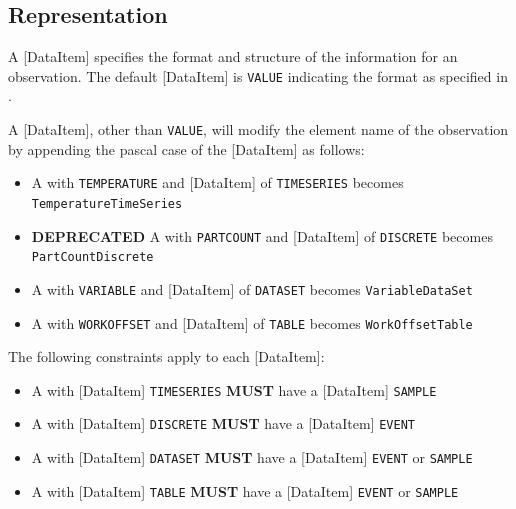 \subsection{Representation} \label{sec:Representation}


A [DataItem] specifies the format and structure of the information for an \gls{observation}. The default [DataItem] is \texttt{VALUE} indicating the format as specified in .

A [DataItem], other than \texttt{VALUE}, will modify the element name of the \gls{observation} by appending the pascal case of the [DataItem] as follows:

\begin{itemize}
\item  A  with  \texttt{TEMPERATURE} and [DataItem] of \texttt{TIME\textunderscore SERIES} becomes \texttt{TemperatureTimeSeries}


\item  \textbf{DEPRECATED} A  with  \texttt{PART\textunderscore COUNT} and [DataItem] of \texttt{DISCRETE} becomes \texttt{PartCountDiscrete}


\item  A  with  \texttt{VARIABLE} and [DataItem] of \texttt{DATA\textunderscore SET} becomes \texttt{VariableDataSet}


\item  A  with  \texttt{WORK\textunderscore OFFSET} and [DataItem] of \texttt{TABLE} becomes \texttt{WorkOffsetTable}


\end{itemize}



The following constraints apply to each [DataItem]:

\begin{itemize}
\item  A  with [DataItem] \texttt{TIME\textunderscore SERIES} \textbf{MUST} have a [DataItem] \texttt{SAMPLE}


\item  \DEPRECATED A  with [DataItem] \texttt{DISCRETE} \textbf{MUST} have a [DataItem] \texttt{EVENT}


\item  A  with [DataItem] \texttt{DATA\textunderscore SET} \textbf{MUST} have a [DataItem] \texttt{EVENT} or \texttt{SAMPLE}


\item  A  with [DataItem] \texttt{TABLE} \textbf{MUST} have a [DataItem] \texttt{EVENT} or \texttt{SAMPLE}


\end{itemize}


